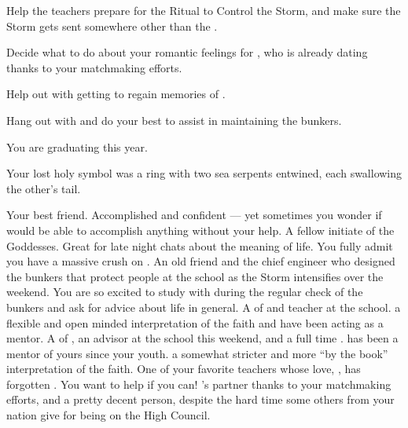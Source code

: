 \documentclass[char]{GL2020}
\begin{document}
\begin{itemz}
    \item Help the teachers prepare for the Ritual to Control the Storm, and make sure the Storm gets sent somewhere other than the \pShip{}.
    \item Decide what to do about your romantic feelings for \cWarlordDaughter{}, who is already dating \cTechStar{} thanks to your matchmaking efforts.
    \item Help \cChupAvenger{} out with getting \cHeadScientist{} to regain \cHeadScientist{\their} memories of \cChupAvenger{}.
    \item Hang out with \cBunker{} and do your best to assist \cBunker{\them} in maintaining the bunkers.
\end{itemz}

\begin{itemz}[Notes]
    \item You are graduating this year.
    \item Your lost holy symbol was a ring with two sea serpents entwined, each swallowing the other's tail.
\end{itemz}

\begin{contacts}
    \contact{\cPresident{}} Your best friend. Accomplished and confident — yet sometimes you wonder if \cPresident{\they} would be able to accomplish anything without your help.
    \contact{\cWarlordDaughter{}} A fellow initiate of the Goddesses. Great for late night chats about the meaning of life. You fully admit you have a massive crush on \cWarlordDaughter{\them}.  
    \contact{\cBunker{}} An old friend and the chief engineer who designed the bunkers that protect people at the school as the Storm intensifies over the weekend. You are so excited to study with \cBunker{\them} during the regular check of the bunkers and ask for \cBunker{\their} advice about life in general.
    \contact{\cFlowPriest{}} A \cFlowPriest{\cleric} of \cFlow{} and teacher at the school. \cFlowPriest{\Theyhave} a flexible and open minded interpretation of the faith and have been acting as a mentor.
    \contact{\cEbbPriest{}} A \cEbbPriest{\cleric} of \cEbb{}, an advisor at the school this weekend, and a full time \cEbbPriest{\cleric}. \cEbbPriest{} has been a mentor of yours since your youth. \cEbbPriest{\Theyhave} a somewhat stricter and more ``by the book'' interpretation of the faith.
    \contact{\cChupAvenger{}} One of your favorite teachers whose love, \cHeadScientist{}, has forgotten \cChupAvenger{\them}. You want to help if you can!
    \contact{\cTechStar{}} \cWarlordDaughter{}’s partner thanks to your matchmaking efforts, and a pretty decent person, despite the hard time some others from your nation give \cTechStar{\them} for being on the \pTech{} High Council.
\end{contacts}
\end{document}
